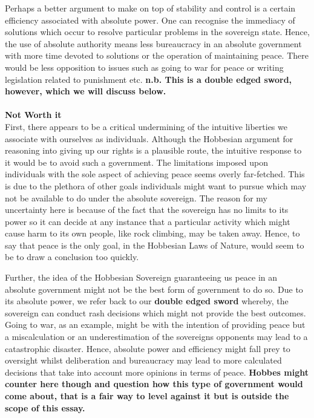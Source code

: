 \documentclass[12pt, letterpaper]{article}
\begin{document}
Perhaps a better argument to make on top of stability and control is a certain efficiency associated with absolute power. One can recognise the immediacy of solutions which occur to resolve particular problems in the sovereign state. Hence, the use of absolute authority means less bureaucracy in an absolute government with more time devoted to solutions or the operation of maintaining peace. There would be less opposition to issues such as going to war for peace or writing legislation related to punishment etc. \textbf{n.b. This is a double edged sword, however, which we will discuss below.}\\\\
\textbf{Not Worth it}\\
First, there appears to be a critical undermining of the intuitive liberties we associate with ourselves as individuals. Although the Hobbesian argument for reasoning into giving up our rights is a plausible route, the intuitive response to it would be to avoid such a government. The limitations imposed upon individuals with the sole aspect of achieving peace seems overly far-fetched. This is due to the plethora of other goals individuals might want to pursue which may not be available to do under the absolute sovereign. The reason for my uncertainty here is because of the fact that the sovereign has no limits to its power so it can decide at any instance that a particular activity which might cause harm to its own people, like rock climbing, may be taken away. Hence, to say that peace is the only goal, in the Hobbesian Laws of Nature, would seem to be to draw a conclusion too quickly.

Further, the idea of the Hobbesian Sovereign guaranteeing us peace in an absolute government might not be the best form of government to do so. Due to its absolute power, we refer back to our \textbf{double edged sword} whereby, the sovereign can conduct rash decisions which might not provide the best outcomes. Going to war, as an example, might be with the intention of providing peace but a miscalculation or an underestimation of the sovereigns opponents may lead to a catastrophic disaster. Hence, absolute power and efficiency might fall prey to oversight whilst deliberation and bureaucracy may lead to more calculated decisions that take into account more opinions in terms of peace. \textbf{Hobbes might counter here though and question how this type of government would come about, that is a fair way to level against it but is outside the scope of this essay.}
\end{document}
